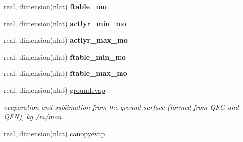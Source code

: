 \begin{DoxyCompactItemize}
\item 
\hypertarget{structctem__statevars_1_1class__moyr__output_ac9c2a3cbd17d2a5f3d5df532d741efd4}{}real, dimension(nlat) {\bfseries ftable\+\_\+mo}\label{structctem__statevars_1_1class__moyr__output_ac9c2a3cbd17d2a5f3d5df532d741efd4}

\item 
\hypertarget{structctem__statevars_1_1class__moyr__output_a8b5badb87521319f1d229c3d3cda6260}{}real, dimension(nlat) {\bfseries actlyr\+\_\+min\+\_\+mo}\label{structctem__statevars_1_1class__moyr__output_a8b5badb87521319f1d229c3d3cda6260}

\item 
\hypertarget{structctem__statevars_1_1class__moyr__output_a35ba0b94f290363739e6bc873e64498f}{}real, dimension(nlat) {\bfseries actlyr\+\_\+max\+\_\+mo}\label{structctem__statevars_1_1class__moyr__output_a35ba0b94f290363739e6bc873e64498f}

\item 
\hypertarget{structctem__statevars_1_1class__moyr__output_a7ea5ae25516b4249c641f16c216125ff}{}real, dimension(nlat) {\bfseries ftable\+\_\+min\+\_\+mo}\label{structctem__statevars_1_1class__moyr__output_a7ea5ae25516b4249c641f16c216125ff}

\item 
\hypertarget{structctem__statevars_1_1class__moyr__output_aa60be3b6d00590c8b686c4b28fe04d32}{}real, dimension(nlat) {\bfseries ftable\+\_\+max\+\_\+mo}\label{structctem__statevars_1_1class__moyr__output_aa60be3b6d00590c8b686c4b28fe04d32}

\item 
\hypertarget{structctem__statevars_1_1class__moyr__output_ae636681ce80a2f7cb933e692cfe06f03}{}real, dimension(nlat) \hyperlink{structctem__statevars_1_1class__moyr__output_ae636681ce80a2f7cb933e692cfe06f03}{groundevap}\label{structctem__statevars_1_1class__moyr__output_ae636681ce80a2f7cb933e692cfe06f03}

\begin{DoxyCompactList}\small\item\em evaporation and sublimation from the ground surface (formed from Q\+F\+G and Q\+F\+N), kg /m/mon \end{DoxyCompactList}\item 
\hypertarget{structctem__statevars_1_1class__moyr__output_a6c8a2d02d531bf12a7007c68a3b5fa39}{}real, dimension(nlat) \hyperlink{structctem__statevars_1_1class__moyr__output_a6c8a2d02d531bf12a7007c68a3b5fa39}{canopyevap}\label{structctem__statevars_1_1class__moyr__output_a6c8a2d02d531bf12a7007c68a3b5fa39}


\end{DoxyCompactItemize}
